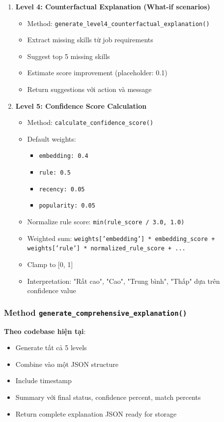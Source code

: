 \begin{enumerate}
    \item \textbf{Level 4: Counterfactual Explanation (What-if scenarios)}
    \begin{itemize}
        \item Method: \texttt{generate\_level4\_counterfactual\_explanation()}
        \item Extract missing skills từ job requirements
        \item Suggest top 5 missing skills
        \item Estimate score improvement (placeholder: 0.1)
        \item Return suggestions với action và message
    \end{itemize}
    
    \item \textbf{Level 5: Confidence Score Calculation}
    \begin{itemize}
        \item Method: \texttt{calculate\_confidence\_score()}
        \item Default weights:
        \begin{itemize}
            \item \texttt{embedding: 0.4}
            \item \texttt{rule: 0.5}
            \item \texttt{recency: 0.05}
            \item \texttt{popularity: 0.05}
        \end{itemize}
        \item Normalize rule score: \texttt{min(rule\_score / 3.0, 1.0)}
        \item Weighted sum: \texttt{weights['embedding'] * embedding\_score + weights['rule'] * normalized\_rule\_score + ...}
        \item Clamp to [0, 1]
        \item Interpretation: "Rất cao", "Cao", "Trung bình", "Thấp" dựa trên confidence value
    \end{itemize}
\end{enumerate}

\subsubsection{Method \texttt{generate\_comprehensive\_explanation()}}

\textbf{Theo codebase hiện tại}:

\begin{itemize}
    \item Generate tất cả 5 levels
    \item Combine vào một JSON structure
    \item Include timestamp
    \item Summary với final status, confidence percent, match percents
    \item Return complete explanation JSON ready for storage
\end{itemize}


